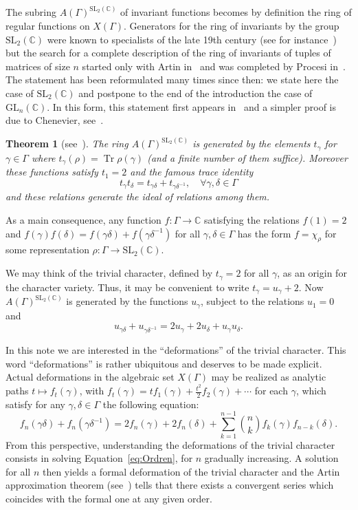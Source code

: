 \documentclass[JEP,XML,SOM,Unicode,NoEqCountersInSection]{cedram}
\newtheorem{theorem}{Theorem}[section]
\theoremstyle{definition}
\newcommand{\CC}{\mathbb{C}}
\newcommand{\tr}{\operatorname{Tr}}
\newcommand{\SL}{\mathrm{SL}}
\newcommand{\GL}{\mathrm{GL}}
\begin{document}
The subring $A(\Gamma)^{\SL_2(\CC)}$ of invariant functions becomes by
definition the ring of regular functions on $X(\Gamma)$. Generators for
the ring of invariants by the group $\SL_2(\CC)$ were known to
specialists of the late 19th century (see for instance~\cite{GraceYoung})
but the search for a complete description of the ring of invariants of
tuples of matrices of size $n$ started only with Artin in~\cite{Artin69}
and was completed by Procesi in~\cite{Procesi}.
The statement has been reformulated many times since then: we state here
the case of $\SL_2(\CC)$ and postpone to the end of the introduction the
case of~$\GL_n(\CC)$.
In this form, this statement first appears
in~\cite[Prop.\,9.1]{BrumfielHilden}
and a simpler proof is due to Chenevier,
see~\cite[Prop.\,2.3]{ChenevierHab}.
\begin{theorem}[see~\cite{BrumfielHilden,
ChenevierHab}]\label{theo:procesi}
The ring $A(\Gamma)^{\SL_2(\CC)}$ is generated by the elements $t_\gamma$
for $\gamma\in \Gamma$ where $t_\gamma(\rho)=\tr \rho(\gamma)$
(and a finite number of them suffice).
Moreover these functions satisfy $t_1=2$ and the famous trace identity
\[ t_\gamma t_\delta=t_{\gamma\delta}+t_{\gamma\delta^{-1}},\quad
\forall \gamma,\delta\in \Gamma \]
and these relations generate the ideal of relations among them.
\end{theorem}
As a main consequence, any function $f\colon\Gamma\to \CC$ satisfying the
relations $f(1)=2$ and
$f(\gamma)f(\delta)=f(\gamma\delta)+f(\gamma\delta^{-1})$ for all
$\gamma,\delta\in \Gamma$ has the form $f=\chi_\rho$ for some
representation $\rho\colon\Gamma\to \SL_2(\CC)$.

We may think of the trivial character, defined by $t_\gamma=2$ for all
$\gamma$, as an origin for the character variety. Thus, it may be convenient
to write $t_\gamma=u_\gamma+2$. Now $A(\Gamma)^{\SL_2(\CC)}$ is generated by
the functions $u_\gamma$, subject to the relations $u_1=0$ and
\begin{equation}\label{eq:u}
u_{\gamma\delta}+u_{\gamma\delta^{-1}}=
2u_\gamma+2u_\delta+u_\gamma u_\delta.
\end{equation}

In this note we are interested in the ``deformations'' of the trivial
character. This word ``deformations'' is rather ubiquitous and deserves to
be made explicit. Actual deformations in the algebraic set $X(\Gamma)$
may be realized as analytic paths $t\mapsto f_t(\gamma)$, with
$f_t(\gamma)=tf_1(\gamma)+\frac{t^2}{2}f_2(\gamma)+\cdots$ for each
$\gamma$, which satisfy for any $\gamma,\delta\in \Gamma$ the following
equation:
\begin{equation}\label{eq:Ordren}
f_n(\gamma\delta)+f_n(\gamma\delta^{-1})=2f_n(\gamma)+2f_n(\delta)+
\sum_{k=1}^{n-1}\binom{n}{k}f_k(\gamma)f_{n-k}(\delta).
\end{equation}
From this perspective, understanding the deformations of the trivial
character consists in solving Equation~\eqref{eq:Ordren},
for $n$ gradually increasing. A solution for all $n$ then yields a
formal deformation of the trivial character and the Artin approximation
theorem (see~\cite{Artin}) tells that there exists a convergent series which
coincides with the formal one at any given order.
\end{document}
